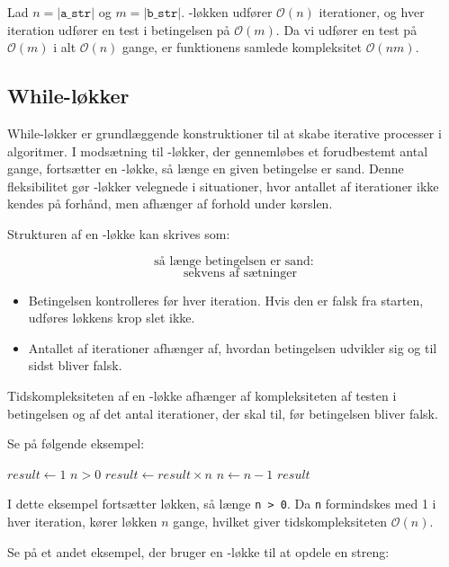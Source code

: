 Lad $n = |\texttt{a\_str}|$ og $m = |\texttt{b\_str}|$. \texttt{\For}-løkken udfører $\mathcal{O}(n)$ iterationer, og hver iteration udfører en test i betingelsen på $\mathcal{O}(m)$. Da vi udfører en test på $\mathcal{O}(m)$ i alt $\mathcal{O}(n)$ gange, er funktionens samlede kompleksitet $\mathcal{O}(nm)$.

\subsection*{While-løkker}

While-løkker er grundlæggende konstruktioner til at skabe iterative processer i algoritmer. I modsætning til \texttt{\For}-løkker, der gennemløbes et forudbestemt antal gange, fortsætter en \texttt{\While}-løkke, så længe en given betingelse er sand. Denne fleksibilitet gør \texttt{\While}-løkker velegnede i situationer, hvor antallet af iterationer ikke kendes på forhånd, men afhænger af forhold under kørslen.

Strukturen af en \texttt{\While}-løkke kan skrives som:

\[
\text{så længe betingelsen er sand:}
\]
\[
\quad \text{sekvens af sætninger}
\]

\begin{itemize}
    \item Betingelsen kontrolleres før hver iteration. Hvis den er falsk fra starten, udføres løkkens krop slet ikke.
    \item Antallet af iterationer afhænger af, hvordan betingelsen udvikler sig og til sidst bliver falsk.
\end{itemize}

Tidskompleksiteten af en \texttt{\While}-løkke afhænger af kompleksiteten af testen i betingelsen og af det antal iterationer, der skal til, før betingelsen bliver falsk.

Se på følgende eksempel:

\begin{codebox}
    \li $result \gets 1$
    \li \While $n > 0$ \Do
    \li     $result \gets result \times n$
    \li     $n \gets n - 1$
        \End
    \li \Return $result$
\end{codebox}

I dette eksempel fortsætter løkken, så længe \texttt{n > 0}. Da \texttt{n} formindskes med 1 i hver iteration, kører løkken $n$ gange, hvilket giver tidskompleksiteten $\mathcal{O}(n)$.

Se på et andet eksempel, der bruger en \texttt{\While}-løkke til at opdele en streng:

